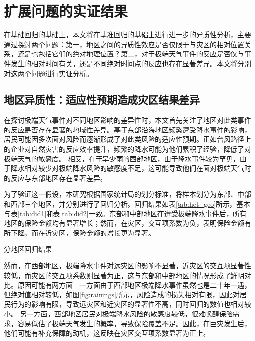 \chapter{扩展问题的实证结果}\label{chap:4.1}
在基础回归的基础上，本文将在基准回归的基础上进行进一步的异质性分析，主要通过探讨两个问题：第一，地区之间的异质性效应是否仅限于与灾区的相对位置关系，还是也包括它们的绝对地理位置？第二，对于极端天气事件的反应是否仅与事件发生的相对时间有关，还是不同绝对时间点的反应也存在显著差异。本文将分别对这两个问题进行实证分析。

\section{地区异质性：适应性预期造成灾区结果差异}
在探讨极端天气事件对不同地区影响的差异性时，本文首先关注了地区对此类事件的反应是否存在显著的地域性差异。基于东部沿海地区频繁遭受降水事件的影响，居民可能因多次面对风险而逐渐形成了对此类风险的适应性预期。正如台风路径上的企业对自然灾害的反应效率提升\citep{0Do}，频繁的降水可能为他们累积了经验，降低了对极端天气的敏感度\citep{陈思柳2021不同决策情境下的损失厌恶效应差异}。
相反，在干旱少雨的西部地区，由于降水事件较为罕见，由于降水相对较少对极端降水风险的敏感度不足，这可能导致他们在面对极端天气时的反应与东部地区存在显著差异。

为了验证这一假设，本研究根据国家统计局的划分标准，将样本划分为东部、中部和西部三个地区，并分别进行了回归分析。回归结果如表\ref{tab:het_geo}所示，基本与表\ref{tab:did1}和表\ref{tab:did2}一致。东部和中部地区在遭受极端降水事件后，所有地区的保险金额均有显著增长；然而，在灾区，交互项系数为负，表明保险金额有所下降，而在近灾区，保险金额的增长更为显著。

\begin{table}
    \centering
    \caption{分地区回归结果}\label{tab:het_geo}
    
\end{table}

然而，在西部地区，极端降水事件对远灾区的影响不显著，近灾区的交互项显著性较低，而灾区的交互项系数则显著为正，这与东部和中部地区的情况形成了鲜明对比。原因可能有两方面：一方面由于西部地区极端降水事件虽然也是二十年一遇，但绝对值相对较低，如图\ref{fig:rainings}所示，风险造成的损失相对有限，因此对居民行为的影响有限，导致远灾区和近灾区的显著性不高，同时回归的数值也相对较小。
另一方面，西部地区居民对极端降水风险的敏感度较低，很难唤醒保险需求，容易低估了极端天气发生的概率\citep{tversky1973availability}，导致保险覆盖不足。因此，在巨灾发生后，他们可能有补充保障的动机，这反映在灾区交互项系数显著为正上。

